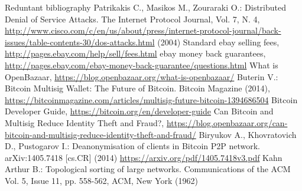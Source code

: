 Reduntant bibliography
     Patrikakis C., Masikos M., Zouraraki O.: Distributed Denial of Service Attacks. The Internet Protocol Journal, Vol. 7,
     N. 4,
     \url{http://www.cisco.com/c/en/us/about/press/internet-protocol-journal/back-issues/table-contents-30/dos-attacks.html}
     (2004)
     Standard ebay selling fees, \url{http://pages.ebay.com/help/sell/fees.html}
     ebay money back guarantees, \url{http://pages.ebay.com/ebay-money-back-guarantee/questions.html}
     What is OpenBazaar, \url{https://blog.openbazaar.org/what-is-openbazaar/}
     Buterin V.: Bitcoin Multisig Wallet: The Future of Bitcoin. Bitcoin Magazine (2014),
     \url{https://bitcoinmagazine.com/articles/multisig-future-bitcoin-1394686504}
     Bitcoin Developer Guide, \url{https://bitcoin.org/en/developer-guide}
     Can Bitcoin and Multisig Reduce Identity Theft and Fraud?,
     \url{https://blog.openbazaar.org/can-bitcoin-and-multisig-reduce-identity-theft-and-fraud/}
     Biryukov A., Khovratovich D., Pustogarov I.: Deanonymisation of clients in Bitcoin P2P network. arXiv:1405.7418 [cs.CR]
     (2014)
     \url{https://arxiv.org/pdf/1405.7418v3.pdf}
     Kahn Arthur B.: Topological sorting of large networks. Communications of the ACM Vol. 5, Issue 11, pp. 558-562, ACM,
     New York (1962)
